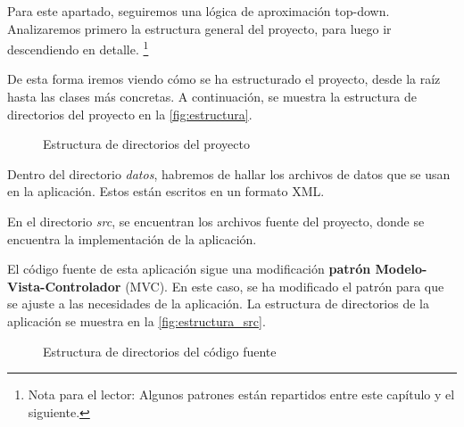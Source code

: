 Para este apartado, seguiremos una lógica de aproximación top-down.
Analizaremos primero la estructura general del proyecto, para luego ir descendiendo en detalle. \footnote{Nota para el lector: Algunos patrones están repartidos entre este capítulo y el siguiente.}


 De esta forma iremos viendo cómo se ha estructurado el proyecto, desde la raíz hasta las clases más concretas.
A continuación, se muestra la estructura de directorios del proyecto en la \autoref{fig:estructura}.


\begin{figure}[h]
    \centering
    \caption{Estructura de directorios del proyecto}
    \label{fig:estructura}
\end{figure}

Dentro del directorio \textit{datos}, habremos de hallar los archivos de datos que se usan en la aplicación.
Estos están escritos en un formato XML\@.

En el directorio \textit{src}, se encuentran los archivos fuente del proyecto, donde se encuentra la implementación de la aplicación.

El código fuente de esta aplicación sigue una modificación \textbf{patrón Modelo-Vista-Controlador} (MVC).
En este caso, se ha modificado el patrón para que se ajuste a las necesidades de la aplicación.
La estructura de directorios de la aplicación se muestra en la \autoref{fig:estructura_src}.

\begin{figure}[h]
    \centering
    \caption{Estructura de directorios del código fuente}
    \label{fig:estructura_src}
\end{figure}

